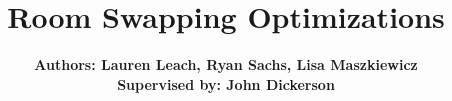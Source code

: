\documentclass[12pt]{article}
\title{Room Swapping Optimizations}
\begin{document}
\maketitle

\begin{center}
\author{\textbf {Authors: Lauren Leach, Ryan Sachs, Lisa Maszkiewicz\\ \footnotesize Supervised by: John Dickerson\\ }} 
 

\begin{abstract}
\end{abstract}

\end{center}
\end{document}
